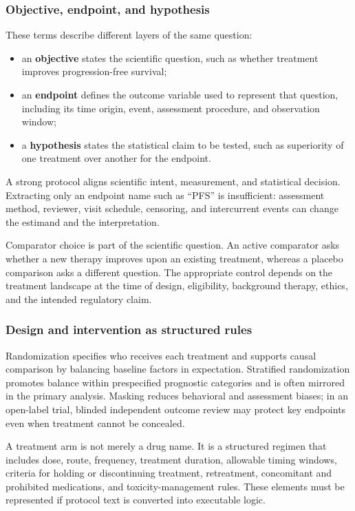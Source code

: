 \documentclass[12pt,oneside]{book}
\numberwithin{equation}{section}
\theoremstyle{definition}
\theoremstyle{plain}
\theoremstyle{remark}
\begin{document}
\subsubsection{Objective, endpoint, and hypothesis}

These terms describe different layers of the same question:
\begin{itemize}
    \item an \textbf{objective} states the scientific question, such as whether
    treatment improves progression-free survival;
    \item an \textbf{endpoint} defines the outcome variable used to represent
    that question, including its time origin, event, assessment procedure, and
    observation window;
    \item a \textbf{hypothesis} states the statistical claim to be tested, such
    as superiority of one treatment over another for the endpoint.
\end{itemize}
A strong protocol aligns scientific intent, measurement, and statistical
decision.  Extracting only an endpoint name such as ``PFS'' is insufficient:
assessment method, reviewer, visit schedule, censoring, and intercurrent events
can change the estimand and the interpretation.

Comparator choice is part of the scientific question.  An active comparator
asks whether a new therapy improves upon an existing treatment, whereas a
placebo comparison asks a different question.  The appropriate control depends
on the treatment landscape at the time of design, eligibility, background
therapy, ethics, and the intended regulatory claim.

\subsubsection{Design and intervention as structured rules}

Randomization specifies who receives each treatment and supports causal
comparison by balancing baseline factors in expectation.  Stratified
randomization promotes balance within prespecified prognostic categories and
is often mirrored in the primary analysis.  Masking reduces behavioral and
assessment biases; in an open-label trial, blinded independent outcome review
may protect key endpoints even when treatment cannot be concealed.

A treatment arm is not merely a drug name.  It is a structured regimen that
includes dose, route, frequency, treatment duration, allowable timing windows,
criteria for holding or discontinuing treatment, retreatment, concomitant and
prohibited medications, and toxicity-management rules.  These elements must be
represented if protocol text is converted into executable logic.
\end{document}
